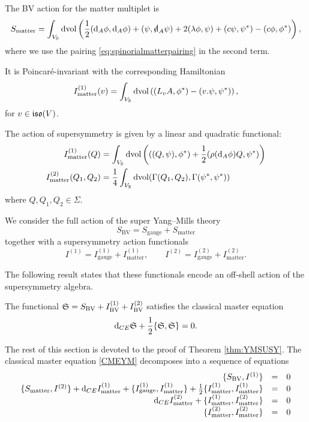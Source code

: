 \documentclass[10pt, oneside]{article}
\newcommand{\BV}{\mathrm{BV}}
\newcommand{\gauge}{\mathrm{gauge}}
\newcommand{\matter}{\mathrm{matter}}
\begin{document}
The BV action for the matter multiplet is
\[
S_{\matter} = \int_{V_\RR} \dvol \left(\frac{1}{2}  (\d_A \phi, \d_A \phi) + (\psi , \sd \d_A \psi) + 2 (\lambda\phi, \psi) + (c\psi, \psi^*) - (c\phi, \phi^*)\right),
\]
where we use the pairing \eqref{eq:spinorialmatterpairing} in the second term.

It is Poincar\'{e}-invariant with the corresponding Hamiltonian
\begin{equation}
I_{\matter}^{(1)}(v) = \int_{V_\RR}\dvol\left( (L_{v}A, \phi^*) - (v.\psi, \psi^*)\right),
\label{eq:matterPoincareaction}
\end{equation}
for $v\in\mathfrak{iso}(V)$.

The action of supersymmetry is given by a linear and quadratic functional:
\begin{align*}
I_{\matter}^{(1)} (Q) & = \int_{V_\RR}\dvol\left( ((Q, \psi), \phi^*) + \frac{1}{2}(\rho(\d_A \phi) Q, \psi^*)\right) \\
I_{\matter}^{(2)} (Q_1 , Q_2) & = \frac{1}{4}\int_{V_\RR} \dvol(\Gamma(Q_1, Q_2) , \Gamma(\psi^*, \psi^*))
\end{align*}
where $Q, Q_1,Q_2 \in \Sigma$.

We consider the full action of the super Yang--Mills theory
\[S_{\BV} = S_{\gauge} + S_{\matter}\]
together with a supersymmetry action functionals
\[I^{(1)} = I^{(1)}_{\gauge} + I^{(1)}_{\matter},\qquad I^{(2)} = I^{(2)}_{\gauge} + I^{(2)}_{\matter}.\]

The following result states that these functionals encode an off-shell action of the supersymmetry algebra.

\begin{thm}
The functional $\fS = S_{\BV} + I_{\BV}^{(1)} + I_{\BV}^{(2)}$ satisfies the classical master equation
\begin{equation}
\label{CMEYM}
{\rm d}_{CE} \mathfrak S + \frac{1}{2} \{\mathfrak S, \mathfrak S\} = 0 .
\end{equation}
\label{thm:YMSUSY}
\end{thm}

The rest of this section is devoted to the proof of Theorem \ref{thm:YMSUSY}. The classical master equation \eqref{CMEYM} decomposes into a sequence of equations
\begin{equation}
\label{CMEYM2}
\begin{array}{rrrrrr}
\{S_{\BV} , I^{(1)}\} & = & 0 \\ 
\{S_{\matter}, I^{(2)}\} + \d_{CE} I_{\matter}^{(1)} + \{I_{\gauge}^{(1)}, I_{\matter}^{(1)}\} + \frac{1}{2} \{I_{\matter}^{(1)}, I_{\matter}^{(1)}\} & = & 0 \\
\d_{CE} I_{\matter}^{(2)} + \{I_{\matter}^{(1)}, I_{\matter}^{(2)}\} & =& 0 \\
\{I_{\matter}^{(2)}, I_{\matter}^{(2)}\} & =& 0
\end{array}
\end{equation}
\end{document}
